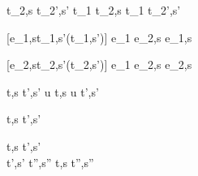   {t_2,s  t_2',s' }
  {t_1 \Or t_2,s  t_1 \Or t_2',s'}


[e_1,s\evaluate t_1,s'\wedge \neg\Failing(t_1,s')]
  { }
  {e_1 \Xor e_2,s \handle{\Left} e_1,s}

[e_2,s\evaluate t_2,s'\wedge \neg\Failing(t_2,s')]
  { }
  {e_1 \Xor e_2,s \handle{\Right} e_2,s}


  {t,s  t',s'}
  {u \At t,s u \At t',s'}

















  {t,s  t',s'}


  {t,s  t',s' \\
   t',s' \normalise t'',s''}
  {t,s  t'',s''}
